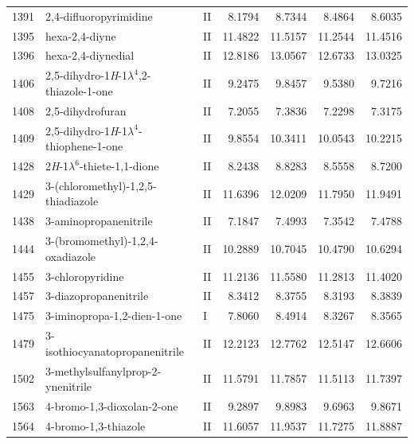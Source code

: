 \begin{longtable}{rlld{2.5}d{2.5}d{2.5}d{2.5}}
    1391 & 2,4-difluoropyrimidine                                 & II & 8.1794  & 8.7344  & 8.4864  & 8.6035  \\
    1395 & hexa-2,4-diyne                                         & II & 11.4822 & 11.5157 & 11.2544 & 11.4516 \\
    1396 & hexa-2,4-diynedial                                     & II & 12.8186 & 13.0567 & 12.6733 & 13.0325 \\
    1406 & 2,5-dihydro-1\textit{H}-1$\lambda^4$,2-thiazole-1-one  & II & 9.2475  & 9.8457  & 9.5380  & 9.7216  \\
    1408 & 2,5-dihydrofuran                                       & II & 7.2055  & 7.3836  & 7.2298  & 7.3175  \\
    1409 & 2,5-dihydro-1\textit{H}-1$\lambda^4$-thiophene-1-one   & II & 9.8554  & 10.3411 & 10.0543 & 10.2215 \\
    1428 & 2\textit{H}-1$\lambda^6$-thiete-1,1-dione              & II & 8.2438  & 8.8283  & 8.5558  & 8.7200  \\
    1429 & 3-(chloromethyl)-1,2,5-thiadiazole                     & II & 11.6396 & 12.0209 & 11.7950 & 11.9491 \\
    1438 & 3-aminopropanenitrile                                  & II & 7.1847  & 7.4993  & 7.3542  & 7.4788  \\
    1444 & 3-(bromomethyl)-1,2,4-oxadiazole                       & II & 10.2889 & 10.7045 & 10.4790 & 10.6294 \\
    1455 & 3-chloropyridine                                       & II & 11.2136 & 11.5580 & 11.2813 & 11.4020 \\
    1457 & 3-diazopropanenitrile                                  & II & 8.3412  & 8.3755  & 8.3193  & 8.3839  \\
    1475 & 3-iminopropa-1,2-dien-1-one                            & I  & 7.8060  & 8.4914  & 8.3267  & 8.3565  \\
    1479 & 3-isothiocyanatopropanenitrile                         & II & 12.2123 & 12.7762 & 12.5147 & 12.6606 \\
    1502 & 3-methylsulfanylprop-2-ynenitrile                      & II & 11.5791 & 11.7857 & 11.5113 & 11.7397 \\
    1563 & 4-bromo-1,3-dioxolan-2-one                             & II & 9.2897  & 9.8983  & 9.6963  & 9.8671  \\
    1564 & 4-bromo-1,3-thiazole                                   & II & 11.6057 & 11.9537 & 11.7275 & 11.8887 \\

\end{longtable}
